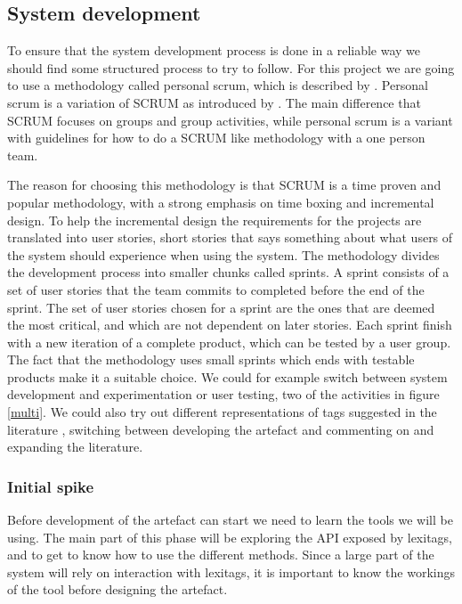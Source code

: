 \subsection{System development}
To ensure that the system development process is done in a reliable way we should find some structured process to try to follow.
For this project we are going to use a methodology called personal scrum, which is described by \citet{Pruitt2011}.
Personal scrum is a variation of SCRUM as introduced by \citet{Schwaber1995}. 
The main difference that SCRUM focuses on groups and group activities, while personal scrum is a variant with guidelines for how to do a SCRUM like methodology with a one person team.

The reason for choosing this methodology is that SCRUM is a time proven and popular methodology, with a strong emphasis on time boxing and incremental design.
To help the incremental design the requirements for the projects are translated into user stories,
short stories that says something about what users of the system should experience when using the system.
The methodology divides the development process into smaller chunks called sprints. 
A sprint consists of a set of user stories that the team commits to completed before the end of the sprint.
The set of user stories chosen for a sprint are the ones that are deemed the most critical, and which are not dependent on later stories. 
Each sprint finish with a new iteration of a complete product, which can be tested by a user group.
The fact that the methodology uses small sprints which ends with testable products make it a suitable choice.
We could for example switch between system development and experimentation or user testing, two of the activities in figure \ref{multi}.
We could also try out different representations of tags suggested in the literature \citep{Mika2005,Gruber2007,Scerri2008}, 
switching between developing the artefact and commenting on and expanding the literature.

\subsubsection{Initial spike}
Before development of the artefact can start we need to learn the tools we will be using. 
The main part of this phase will be exploring the API exposed by lexitags, and to get to know how to use the different methods.
Since a large part of the system will rely on interaction with lexitags, it is important to know the workings of the tool before designing the artefact.

